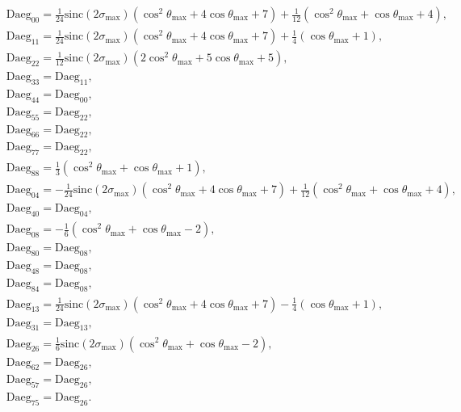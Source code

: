 \documentclass[a4paper,11pt,twoside,openright]{book}
\providecommand{\sinc}{{\mathrm{sinc}}}%
\def\lthtmlcheckvsize{\ifdim\ht\sizebox<\vsize 
  \ifdim\wd\sizebox<\hsize\expandafter\hfill\fi \expandafter\vfill
  \else\expandafter\vss\fi}%
\begin{document}
{\newpage\clearpage
\setcounter{equation}{25}
%
\begin{subequations}\begin{align}
&\textrm{Daeg}_{00} = \tfrac{1}{24} \sinc (2\sigma_{\textrm{max}}) \left( \cos^2\theta_{\textrm{max}}+ 4\cos\theta_{\textrm{max}}+ 7 \right)  +  \tfrac{1}{12} \left( \cos^2\theta_{\textrm{max}}+ \cos\theta_{\textrm{max}}+ 4 \right) , \\
&\textrm{Daeg}_{11} = \tfrac{1}{24} \sinc (2\sigma_{\textrm{max}}) \left( \cos^2\theta_{\textrm{max}}+ 4\cos\theta_{\textrm{max}}+ 7 \right)  + \tfrac{1}{4}\left( \cos\theta_{\textrm{max}}+ 1 \right), \\
&\textrm{Daeg}_{22} = \tfrac{1}{12} \sinc (2\sigma_{\textrm{max}}) \left( 2\cos^2\theta_{\textrm{max}}+ 5\cos\theta_{\textrm{max}}+ 5 \right) , \\
&\textrm{Daeg}_{33} = \textrm{Daeg}_{11} , \\
&\textrm{Daeg}_{44} = \textrm{Daeg}_{00} , \\
&\textrm{Daeg}_{55} = \textrm{Daeg}_{22} , \\
&\textrm{Daeg}_{66} = \textrm{Daeg}_{22} , \\
&\textrm{Daeg}_{77} = \textrm{Daeg}_{22} , \\
&\textrm{Daeg}_{88} = \tfrac{1}{3} \left( \cos^2\theta_{\textrm{max}}+ \cos\theta_{\textrm{max}}+ 1 \right) , \\
&\textrm{Daeg}_{04} = -\tfrac{1}{24} \sinc (2\sigma_{\textrm{max}}) \left( \cos^2\theta_{\textrm{max}}+ 4\cos\theta_{\textrm{max}}+ 7 \right)  +  \tfrac{1}{12} \left( \cos^2\theta_{\textrm{max}}+ \cos\theta_{\textrm{max}}+ 4 \right) , \\
&\textrm{Daeg}_{40} = \textrm{Daeg}_{04} , \\
&\textrm{Daeg}_{08} = -\tfrac{1}{6} \left( \cos^2\theta_{\textrm{max}}+ \cos\theta_{\textrm{max}}- 2 \right) , \\
&\textrm{Daeg}_{80} = \textrm{Daeg}_{08} , \\
&\textrm{Daeg}_{48} = \textrm{Daeg}_{08} , \\
&\textrm{Daeg}_{84} = \textrm{Daeg}_{08} , \\
&\textrm{Daeg}_{13} = \tfrac{1}{24} \sinc (2\sigma_{\textrm{max}}) \left( \cos^2\theta_{\textrm{max}}+ 4\cos\theta_{\textrm{max}}+ 7 \right)  -  \tfrac{1}{4}\left( \cos\theta_{\textrm{max}}+ 1 \right) , \\
&\textrm{Daeg}_{31} = \textrm{Daeg}_{13} , \\
&\textrm{Daeg}_{26} = \tfrac{1}{6} \sinc (2\sigma_{\textrm{max}}) \left( \cos^2\theta_{\textrm{max}}+ \cos\theta_{\textrm{max}}- 2 \right) , \\
&\textrm{Daeg}_{62} = \textrm{Daeg}_{26} , \\
&\textrm{Daeg}_{57} = \textrm{Daeg}_{26} , \\
&\textrm{Daeg}_{75} = \textrm{Daeg}_{26} .
\end{align}\end{subequations}%
\lthtmldisplayZ
\lthtmlcheckvsize\clearpage}
\end{document}
